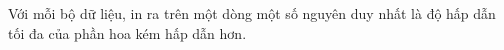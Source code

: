 Với mỗi bộ dữ liệu, in ra trên một dòng một số nguyên duy nhất là độ hấp dẫn tối đa của phần hoa kém hấp dẫn hơn.